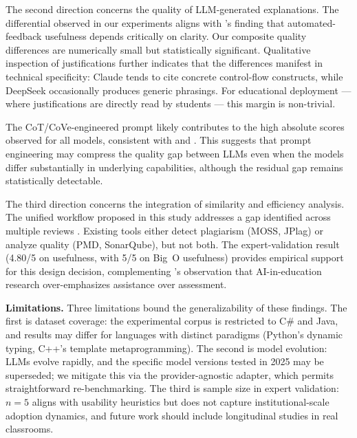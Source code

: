 \documentclass[twocolumn,11pt]{article}
\begin{document}
    The second direction concerns the quality of LLM-generated explanations. The differential observed in our experiments aligns with \citet{keuning2018systematic}'s finding that automated-feedback usefulness depends critically on clarity. Our composite quality differences are numerically small but statistically significant. Qualitative inspection of justifications further indicates that the differences manifest in technical specificity: Claude tends to cite concrete control-flow constructs, while DeepSeek occasionally produces generic phrasings. For educational deployment --- where justifications are directly read by students --- this margin is non-trivial.
     
    The CoT/CoVe-engineered prompt likely contributes to the high absolute scores observed for all models, consistent with \citet{wei2022chain} and \citet{dhuliawala2024chain}. This suggests that prompt engineering may compress the quality gap between LLMs even when the models differ substantially in underlying capabilities, although the residual gap remains statistically detectable.
     
    The third direction concerns the integration of similarity and efficiency analysis. The unified workflow proposed in this study addresses a gap identified across multiple reviews \citep{lee2023review,zakeri2023systematic,zviel2024good}. Existing tools either detect plagiarism (MOSS, JPlag) or analyze quality (PMD, SonarQube), but not both. The expert-validation result (4.80/5 on usefulness, with 5/5 on Big~O usefulness) provides empirical support for this design decision, complementing \citet{manorat2025artificial}'s observation that AI-in-education research over-emphasizes assistance over assessment.
     
    \textbf{Limitations.} Three limitations bound the generalizability of these findings. The first is dataset coverage: the experimental corpus is restricted to C\# and Java, and results may differ for languages with distinct paradigms (Python's dynamic typing, C++'s template metaprogramming). The second is model evolution: LLMs evolve rapidly, and the specific model versions tested in 2025 may be superseded; we mitigate this via the provider-agnostic adapter, which permits straightforward re-benchmarking. The third is sample size in expert validation: $n=5$ aligns with usability heuristics \citep{kusmaryono2022number} but does not capture institutional-scale adoption dynamics, and future work should include longitudinal studies in real classrooms.
     
\end{document}
